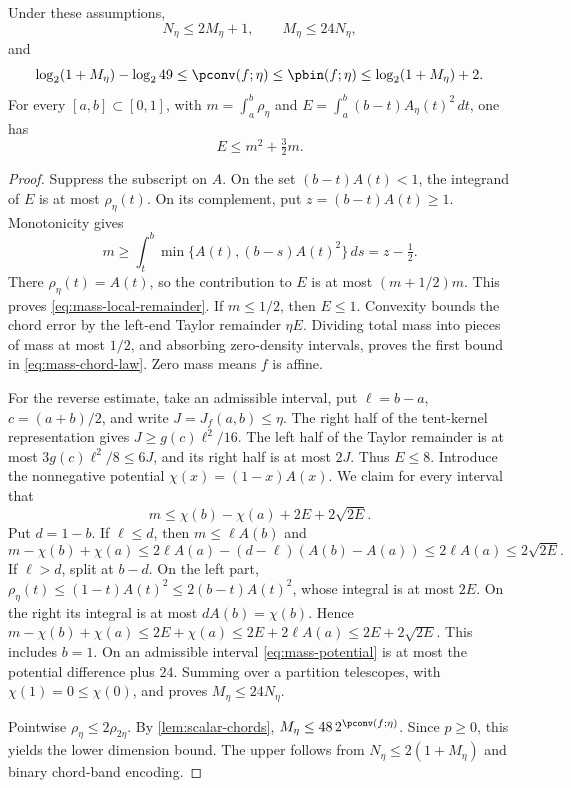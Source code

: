\begin{theorem}\label{thm:curvature-mass}
Under these assumptions,
\begin{equation}\label{eq:mass-chord-law}
 N_\eta\le2M_\eta+1,\qquad M_\eta\le24N_\eta,
\end{equation}
and
\begin{equation}\label{eq:mass-dimension-law}
 \log_2(1+M_\eta)-\log_2 49\le\pconv(f;\eta)
 \le\pbin(f;\eta)\le\log_2(1+M_\eta)+2.
\end{equation}
For every $[a,b]\subset[0,1]$, with
$m=\int_a^b\rho_\eta$ and
$E=\int_a^b(b-t)A_\eta(t)^2\,dt$, one has
\begin{equation}\label{eq:mass-local-remainder}
 E\le m^2+\tfrac32m.
\end{equation}
\end{theorem}
\begin{proof}
Suppress the subscript on $A$. On the set $(b-t)A(t)<1$, the
integrand of $E$ is at most $\rho_\eta(t)$. On its complement, put
$z=(b-t)A(t)\ge1$. Monotonicity gives
\[
 m\ge\int_t^b\min\{A(t),(b-s)A(t)^2\}\,ds=z-\tfrac12.
\]
There $\rho_\eta(t)=A(t)$, so the contribution to $E$ is at most
$(m+1/2)m$. This proves \eqref{eq:mass-local-remainder}. If $m\le1/2$,
then $E\le1$. Convexity bounds the chord error by the left-end Taylor
remainder $\eta E$. Dividing total mass into pieces of mass at most
$1/2$, and absorbing zero-density intervals, proves the first bound
in \eqref{eq:mass-chord-law}. Zero mass means $f$ is affine.

For the reverse estimate, take an admissible interval, put
$\ell=b-a$, $c=(a+b)/2$, and write $J=J_f(a,b)\le\eta$.
The right half of the tent-kernel representation gives
$J\ge g(c)\ell^2/16$. The left half of the Taylor remainder is at
most $3g(c)\ell^2/8\le6J$, and its right half is at most $2J$.
Thus $E\le8$. Introduce the nonnegative potential
$\chi(x)=(1-x)A(x)$. We claim for every interval that
\begin{equation}\label{eq:mass-potential}
 m\le\chi(b)-\chi(a)+2E+2\sqrt{2E}.
\end{equation}
Put $d=1-b$. If $\ell\le d$, then $m\le\ell A(b)$ and
\[
 m-\chi(b)+\chi(a)
 \le2\ell A(a)-(d-\ell)(A(b)-A(a))
 \le2\ell A(a)\le2\sqrt{2E}.
\]
If $\ell>d$, split at $b-d$. On the left part,
$\rho_\eta(t)\le(1-t)A(t)^2\le2(b-t)A(t)^2$, whose integral is at
most $2E$. On the right its integral is at most $dA(b)=\chi(b)$.
Hence $m-\chi(b)+\chi(a)\le2E+\chi(a)
\le2E+2\ell A(a)\le2E+2\sqrt{2E}$. This includes $b=1$.
On an admissible interval \eqref{eq:mass-potential} is at most the
potential difference plus $24$. Summing over a partition telescopes,
with $\chi(1)=0\le\chi(0)$, and proves $M_\eta\le24N_\eta$.

Pointwise $\rho_\eta\le2\rho_{2\eta}$. By
\cref{lem:scalar-chords}, $M_\eta\le48\,2^{\pconv(f;\eta)}$.
Since $p\ge0$, this yields the lower dimension bound. The upper follows
from $N_\eta\le2(1+M_\eta)$ and binary chord-band encoding.
\end{proof}

